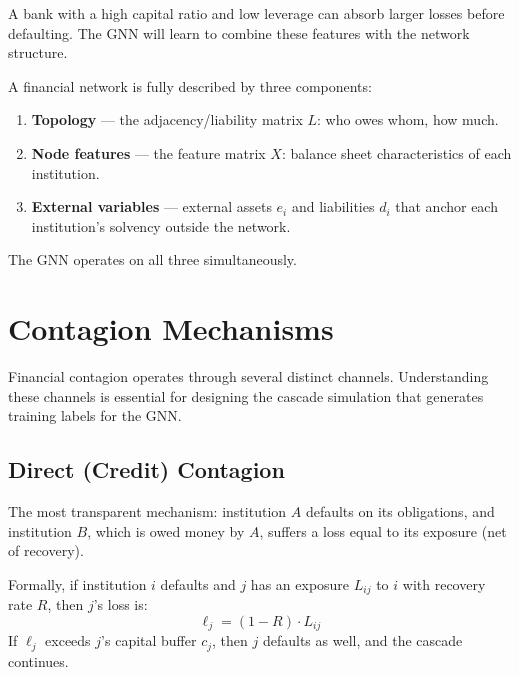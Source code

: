 \documentclass[11pt, a4paper]{article}
\theoremstyle{definition}
\theoremstyle{plain}
\theoremstyle{remark}
\begin{document}
A bank with a high capital ratio and low leverage can absorb larger losses before
defaulting.
The GNN will learn to combine these features with the network structure.

\begin{keyresult}
A financial network is fully described by three components:
\begin{enumerate}
    \item \textbf{Topology} --- the adjacency/liability matrix $L$: who owes whom,
          how much.
    \item \textbf{Node features} --- the feature matrix $X$: balance sheet
          characteristics of each institution.
    \item \textbf{External variables} --- external assets $e_i$ and liabilities $d_i$
          that anchor each institution's solvency outside the network.
\end{enumerate}
The GNN operates on all three simultaneously.
\end{keyresult}

\section{Contagion Mechanisms}
\label{sec:contagion}

Financial contagion operates through several distinct channels.
Understanding these channels is essential for designing the cascade simulation
that generates training labels for the GNN.

\subsection{Direct (Credit) Contagion}

The most transparent mechanism: institution $A$ defaults on its obligations,
and institution $B$, which is owed money by $A$, suffers a loss equal to its
exposure (net of recovery).

Formally, if institution $i$ defaults and $j$ has an exposure $L_{ij}$ to $i$
with recovery rate $R$, then $j$'s loss is:
\begin{equation}\label{eq:direct-loss}
    \ell_j = (1 - R) \cdot L_{ij}
\end{equation}
If $\ell_j$ exceeds $j$'s capital buffer $c_j$, then $j$ defaults as well,
and the cascade continues.
\end{document}
